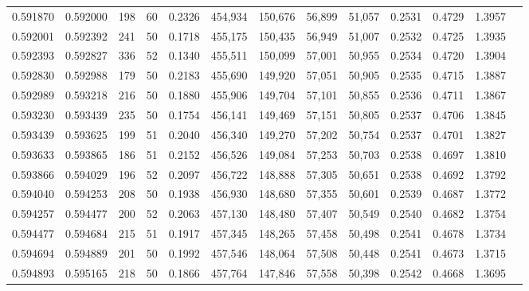 \begin{tabular}{rrrrrrrrrrrrr}
0.591870 & 0.592000 &   198 &  60 &                                     0.2326 & 454,934 & 150,676 &  56,899 &  51,057 & 0.2531 & 0.4729 & 1.3957 \\
0.592001 & 0.592392 &   241 &  50 &                                     0.1718 & 455,175 & 150,435 &  56,949 &  51,007 & 0.2532 & 0.4725 & 1.3935 \\
0.592393 & 0.592827 &   336 &  52 &                                     0.1340 & 455,511 & 150,099 &  57,001 &  50,955 & 0.2534 & 0.4720 & 1.3904 \\
0.592830 & 0.592988 &   179 &  50 &                                     0.2183 & 455,690 & 149,920 &  57,051 &  50,905 & 0.2535 & 0.4715 & 1.3887 \\
0.592989 & 0.593218 &   216 &  50 &                                     0.1880 & 455,906 & 149,704 &  57,101 &  50,855 & 0.2536 & 0.4711 & 1.3867 \\
0.593230 & 0.593439 &   235 &  50 &                                     0.1754 & 456,141 & 149,469 &  57,151 &  50,805 & 0.2537 & 0.4706 & 1.3845 \\
0.593439 & 0.593625 &   199 &  51 &                                     0.2040 & 456,340 & 149,270 &  57,202 &  50,754 & 0.2537 & 0.4701 & 1.3827 \\
0.593633 & 0.593865 &   186 &  51 &                                     0.2152 & 456,526 & 149,084 &  57,253 &  50,703 & 0.2538 & 0.4697 & 1.3810 \\
0.593866 & 0.594029 &   196 &  52 &                                     0.2097 & 456,722 & 148,888 &  57,305 &  50,651 & 0.2538 & 0.4692 & 1.3792 \\
0.594040 & 0.594253 &   208 &  50 &                                     0.1938 & 456,930 & 148,680 &  57,355 &  50,601 & 0.2539 & 0.4687 & 1.3772 \\
0.594257 & 0.594477 &   200 &  52 &                                     0.2063 & 457,130 & 148,480 &  57,407 &  50,549 & 0.2540 & 0.4682 & 1.3754 \\
0.594477 & 0.594684 &   215 &  51 &                                     0.1917 & 457,345 & 148,265 &  57,458 &  50,498 & 0.2541 & 0.4678 & 1.3734 \\
0.594694 & 0.594889 &   201 &  50 &                                     0.1992 & 457,546 & 148,064 &  57,508 &  50,448 & 0.2541 & 0.4673 & 1.3715 \\
0.594893 & 0.595165 &   218 &  50 &                                     0.1866 & 457,764 & 147,846 &  57,558 &  50,398 & 0.2542 & 0.4668 & 1.3695 \\

\end{tabular}
